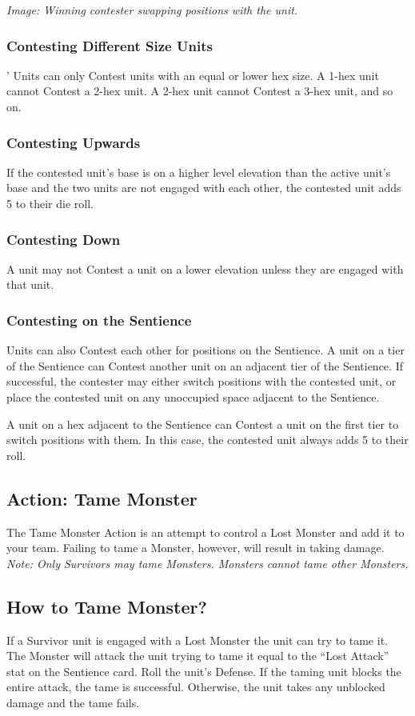 \documentclass[../main.tex]{subfiles}
\begin{document}
\textit{Image: Winning contester swapping positions with the unit.}

\subsubsection{Contesting Different Size Units}'
Units can only Contest units with an equal or lower hex size. A 1-hex unit cannot Contest a 2-hex unit. A 2-hex unit cannot Contest a 3-hex unit, and so on.

\subsubsection{Contesting Upwards}
If the contested unit’s base is on a higher level elevation than the active unit’s base and the two units are not engaged with each other, the contested unit adds 5 to their die roll.

\subsubsection{Contesting Down}
A unit may not Contest a unit on a lower elevation unless they are engaged with that unit.

\subsubsection{Contesting on the Sentience}
Units can also Contest each other for positions on the Sentience. A unit on a tier of the Sentience can Contest another unit on an adjacent tier of the Sentience. If successful, the contester may either switch positions with the contested unit, or place the contested unit on any unoccupied space adjacent to the Sentience.

A unit on a hex adjacent to the Sentience can Contest a unit on the first tier to switch positions with them. In this case, the contested unit always adds 5 to their roll.

\subsection{Action: Tame Monster}
The Tame Monster Action is an attempt to control a Lost Monster and add it to your team. Failing to tame a Monster, however, will result in taking damage.
\textit{Note: Only Survivors may tame Monsters. Monsters cannot tame other Monsters.}

\subsection{How to Tame Monster? }
If a Survivor unit is engaged with a Lost Monster the unit can try to tame it. The Monster will attack the unit trying to tame it equal to the “Lost Attack” stat on the Sentience card. Roll the unit’s Defense. If the taming unit blocks the entire attack, the tame is successful. Otherwise, the unit takes any unblocked damage and the tame fails.
\end{document}
